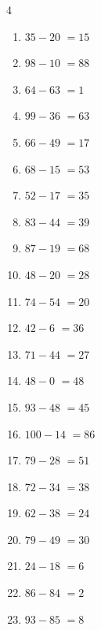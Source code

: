 \begin{multicols}{4}
\begin{enumerate}
  \item $35-20$
        $=15$

  \item $98-10$
        $=88$

  \item $64-63$
        $=1$

  \item $99-36$
        $=63$

  \item $66-49$
        $=17$

  \item $68-15$
        $=53$

  \item $52-17$
        $=35$

  \item $83-44$
        $=39$

  \item $87-19$
        $=68$

  \item $48-20$
        $=28$

  \item $74-54$
        $=20$

  \item $42-6$
        $=36$

  \item $71-44$
        $=27$

  \item $48-0$
        $=48$

  \item $93-48$
        $=45$

  \item $100-14$
        $=86$

\columnbreak %

  \item $79-28$
        $=51$

  \item $72-34$
        $=38$

  \item $62-38$
        $=24$

  \item $79-49$
        $=30$

  \item $24-18$
        $=6$

  \item $86-84$
        $=2$

  \item $93-85$
        $=8$


\end{enumerate}
\end{multicols}
